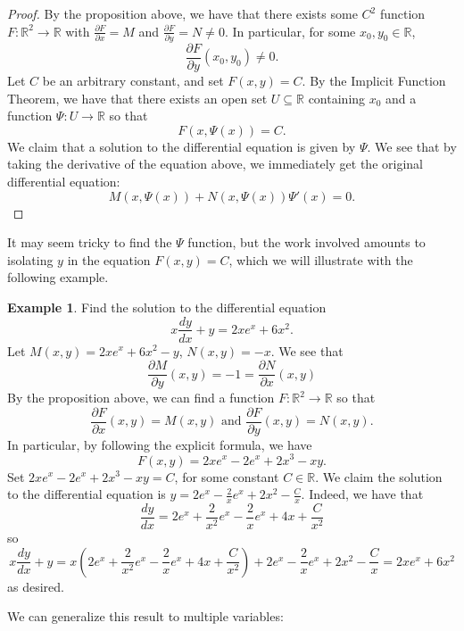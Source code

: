 \documentclass{article}
\theoremstyle{plain} %
\numberwithin{thm}{section} %
\theoremstyle{definition}
\newtheorem{example}[thm]{Example}
\begin{document}
    \begin{proof}
        By the proposition above, we have that there exists some \(C^2\) function \(F : \mathbb{R}^2 \to \mathbb{R}\) with \(\frac{\partial F}{\partial x} = M\) and \(\frac{\partial F}{\partial y} = N \neq 0\). In particular, for some \(x_0,y_0 \in \mathbb{R}\),
        \[
            \frac{\partial F}{\partial y}(x_0, y_0) \neq 0.
        \]
        Let \(C\) be an arbitrary constant, and set \(F(x,y) = C\). By the Implicit Function Theorem, we have that there exists an open set \(U \subseteq \mathbb{R}\) containing \(x_0\) and a function \(\Psi : U \to \mathbb{R}\) so that
        \[
            F(x, \Psi (x)) = C.
        \]
        We claim that a solution to the differential equation is given by \(\Psi\). We see that by taking the derivative of the equation above, we immediately get the original differential equation:
        \[
            M(x, \Psi (x)) + N(x, \Psi (x))\Psi '(x) = 0.
        \]
    \end{proof}
    It may seem tricky to find the \(\Psi\) function, but the work involved amounts to isolating \(y\) in the equation \(F(x,y) = C\), which we will illustrate with the following example.
    \begin{example}
        Find the solution to the differential equation
        \[
            x \dfrac{dy}{dx} + y = 2xe^x + 6x^2.
        \]
        Let \(M(x,y) = 2xe^x + 6x^2 - y\), \(N(x,y) = -x\). We see that
        \[
            \frac{\partial M}{\partial y} (x,y) = -1 = \frac{\partial N}{\partial x} (x,y)
        \]
        By the proposition above, we can find a function \(F : \mathbb{R}^2 \to \mathbb{R}\) so that
        \[
            \frac{\partial F}{\partial x}(x,y) = M(x,y) \text{ and } \frac{\partial F}{\partial y}(x,y) = N(x,y).
        \]
        In particular, by following the explicit formula, we have
        \[
            F(x,y) = 2xe^x - 2e^x + 2x^3 - xy.
        \]
        Set \(2xe^x - 2e^x + 2x^3 - xy = C\), for some constant \(C \in \mathbb{R}\). We claim the solution to the differential equation is \(y = 2e^x - \frac{2}{x}e^x + 2x^2 - \frac{C}{x}\). Indeed, we have that
        \[
            \frac{dy}{dx} = 2e^x + \frac{2}{x^2}e^x - \frac{2}{x}e^x + 4x + \frac{C}{x^2}
        \]
        so
        \[
            x \frac{dy}{dx} + y = x\left( 2e^x + \frac{2}{x^2}e^x - \frac{2}{x}e^x + 4x + \frac{C}{x^2} \right) + 2e^x - \frac{2}{x}e^x + 2x^2 - \frac{C}{x} = 2xe^x + 6x^2
        \]
        as desired.
    \end{example}
    We can generalize this result to multiple variables:
\end{document}
